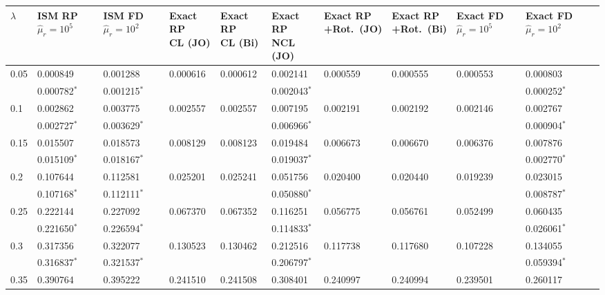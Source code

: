 \documentclass[../thesis.tex]{subfiles}
\begin{document}
\begin{landscape}
\newpage

\begin{longtable}{lllllllllll}%
 \captionsetup{width=1.35\textwidth}
 \hline
 $\lambda$ & \makecell[l]{ISM RP\\$\hat{\mu}_r=10^5$} & \makecell[l]{ISM FD\\$\hat{\mu}_r=10^2$} & \makecell[l]{Exact RP\\CL (JO)} & \makecell[l]{Exact RP\\CL (Bi)} & \makecell[l]{Exact RP\\NCL (JO)} & \makecell[l]{Exact RP\\+Rot.\ (JO)} & \makecell[l]{Exact RP\\+Rot.\ (Bi)} & \makecell[l]{Exact FD\\$\hat{\mu}_r=10^5$} & \makecell[l]{Exact FD\\$\hat{\mu}_r=10^2$}
 \\\hline
 0.05 & 0.000849 & 0.001288 & 0.000616 & 0.000612 & 0.002141 & 0.000559 & 0.000555 & 0.000553 & 0.000803
 \\
 & 0.000782$^*$ & 0.001215$^*$ & & & 0.002043$^*$ & & & & 0.000252$^*$
 \\
 0.1 & 0.002862 & 0.003775 & 0.002557 & 0.002557 & 0.007195 & 0.002191 & 0.002192 & 0.002146 & 0.002767
 \\
 & 0.002727$^*$ & 0.003629$^*$ & & & 0.006966$^*$ & & & & 0.000904$^*$
 \\
 0.15 & 0.015507 & 0.018573 & 0.008129 & 0.008123 & 0.019484 & 0.006673 & 0.006670 & 0.006376 & 0.007876
 \\
 & 0.015109$^*$ & 0.018167$^*$ & & & 0.019037$^*$ & & & & 0.002770$^*$
 \\
 0.2 & 0.107644 & 0.112581 & 0.025201 & 0.025241 & 0.051756 & 0.020400 & 0.020440 & 0.019239 & 0.023015
 \\
 & 0.107168$^*$ & 0.112111$^*$ & & & 0.050880$^*$ & & & & 0.008787$^*$
 \\
 0.25 & 0.222144 & 0.227092 & 0.067370 & 0.067352 & 0.116251 & 0.056775 & 0.056761 & 0.052499 & 0.060435
 \\
 & 0.221650$^*$ & 0.226594$^*$ & & & 0.114833$^*$ & & & & 0.026061$^*$
 \\
 0.3 & 0.317356 & 0.322077 & 0.130523 & 0.130462 & 0.212516 & 0.117738 & 0.117680 & 0.107228 & 0.134055
 \\
 & 0.316837$^*$ & 0.321537$^*$ & & & 0.206797$^*$ & & & & 0.059394$^*$
 \\
 0.35 & 0.390764 & 0.395222 & 0.241510 & 0.241508 & 0.308401 & 0.240997 & 0.240994 & 0.239501 & 0.260117

\end{longtable}
\end{landscape}
\end{document}
